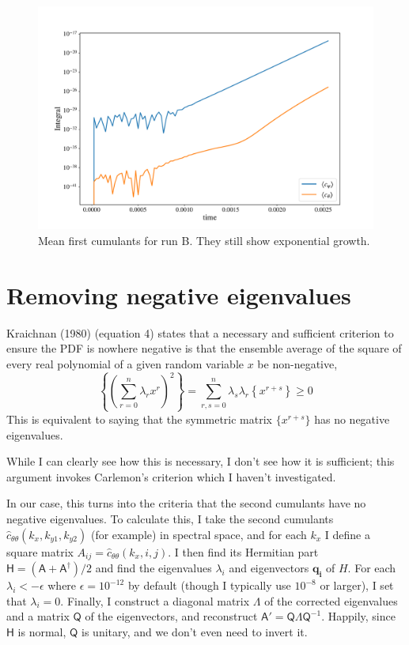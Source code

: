 \documentclass{jfm}
\begin{document}
%
\begin{figure}
  \centering
  \includegraphics[width=\textwidth]{run_B_integrals.pdf}
  \caption{Mean first cumulants for run B. They still show exponential growth.}
  \label{fig:run_B_mean}
\end{figure}

\section{Removing negative eigenvalues}
\label{sec:eigenvalues}

Kraichnan (1980) (equation 4) states that a necessary and sufficient criterion to ensure the PDF is nowhere negative is that the ensemble average of the square of every real polynomial of a given random variable $x$ be non-negative,
\begin{equation}
  \label{eq:Kraichnan_4}
  \left\{\left(\sum_{r = 0}^{n}\lambda_r x^r\right)^2\right\} = \sum_{r,s = 0}^{n} \lambda_s \lambda_r \left\{x^{r+s} \right\} \geq 0
\end{equation}
This is equivalent to saying that the symmetric matrix $\{ x^{r+s}\}$ has no negative eigenvalues.

While I can clearly see how this is necessary, I don't see how it is sufficient; this argument invokes Carlemon's criterion which I haven't investigated.

In our case, this turns into the criteria that the second cumulants have no negative eigenvalues.
To calculate this, I take the second cumulants $\hat{c}_{\theta \theta}(k_x, k_{y1}, k_{y2})$ (for example) in spectral space, and for each $k_x$ I define a square matrix $A_{ij} = \hat{c}_{\theta \theta}(k_x, i, j)$.
I then find its Hermitian part $\mathsf{H} = (\mathsf{A} + \mathsf{A}^\dagger)/2$ and find the eigenvalues $\lambda_i$ and eigenvectors $\mathbf{q_i}$ of $H$.
For each $\lambda_i < -\epsilon$ where $\epsilon = 10^{-12}$ by default (though I typically use $10^{-8}$ or larger), I set that $\lambda_i = 0$.
Finally, I construct a diagonal matrix $\mathsf{\Lambda}$ of the corrected eigenvalues and a matrix $\mathsf{Q}$ of the eigenvectors, and reconstruct $\mathsf{A}' = \mathsf{Q} \mathsf{\Lambda} \mathsf{Q}^{-1}$.
Happily, since $\mathsf{H}$ is normal, $\mathsf{Q}$ is unitary, and we don't even need to invert it.
\end{document}
